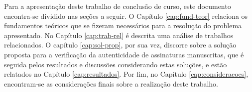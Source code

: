 
Para a apresentação deste trabalho de conclusão de curso, este documento encontra-se dividido nas seções a seguir. O Capítulo \ref{cap:fund-teor} relaciona os fundamentos teóricos que se fizeram necessários para a resolução do problema apresentado. No Capítulo \ref{cap:trab-rel} é descrita uma análise de trabalhos relacionados. O capítulo \ref{cap:sol-prop}, por sua vez, discorre sobre a solução proposta para a verificação da autenticidade de assinaturas manuscritas, que é seguida pelos resultados e discussões considerando estas soluções, e estão relatados no Capítulo \ref{cap:resultados}. Por fim, no Capítulo \ref{cap:consideracoes}, encontram-se as considerações finais sobre a realização deste trabalho.
